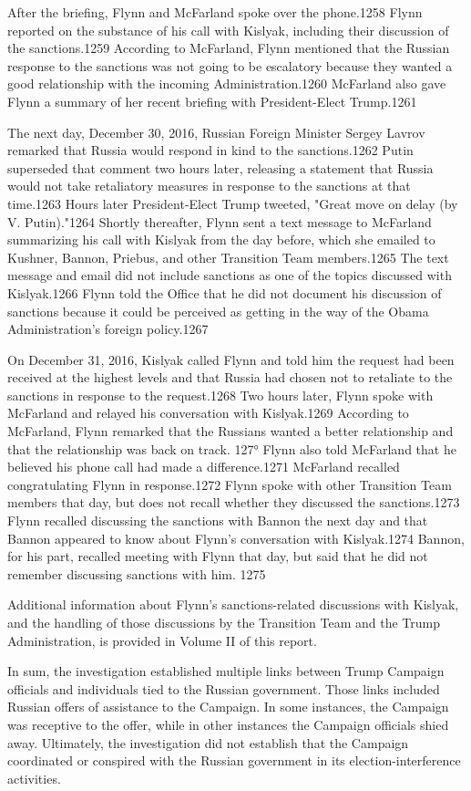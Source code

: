 After the briefing, Flynn and McFarland spoke over the phone.1258 Flynn reported on the substance of his call with Kislyak, including their discussion of the sanctions.1259 According to McFarland, Flynn mentioned that the Russian response to the sanctions was not going to be escalatory because they wanted a good relationship with the incoming Administration.1260 McFarland also gave Flynn a summary of her recent briefing with President-Elect Trump.1261

The next day, December 30, 2016, Russian Foreign Minister Sergey Lavrov remarked that Russia would respond in kind to the sanctions.1262 Putin superseded that comment two hours later, releasing a  statement that Russia would not take retaliatory measures in response to the sanctions at that time.1263 Hours later President-Elect Trump tweeted, "Great move on delay (by V. Putin)."1264 Shortly thereafter, Flynn sent a text message to McFarland summarizing his call with Kislyak from the day before, which she emailed to Kushner, Bannon, Priebus, and other Transition Team members.1265 The text message and email did not include sanctions as one of the topics discussed with Kislyak.1266 Flynn told the Office that he did not document his discussion of sanctions because it could be perceived as getting in the way of the Obama Administration's foreign policy.1267

On December 31, 2016, Kislyak called Flynn and told him the request had been received at the highest levels and that Russia had chosen not to retaliate to the sanctions in response to the request.1268 Two hours later,  Flynn spoke with McFarland and relayed his conversation with Kislyak.1269 According to McFarland, Flynn remarked that the Russians wanted a better relationship and that the relationship was back on track. 127° Flynn also told McFarland that he believed his phone call had made a  difference.1271 McFarland recalled congratulating Flynn in response.1272 Flynn spoke with other Transition Team members that day, but does not recall whether they discussed the sanctions.1273 Flynn recalled discussing the sanctions with Bannon the next day and that Bannon appeared to know about Flynn's conversation with Kislyak.1274 Bannon, for his part, recalled meeting with Flynn that day,  but said that he did not remember discussing sanctions with him. 1275

Additional information about Flynn's sanctions-related discussions with Kislyak, and the handling of those discussions by the Transition Team and the Trump Administration,  is provided in Volume II of this report.

\hr

In sum, the investigation established multiple links between Trump Campaign officials and individuals tied to the Russian government. Those links included Russian offers of assistance to the Campaign. In some instances, the Campaign was receptive to the offer, while in other instances the Campaign officials shied away. Ultimately,  the investigation did not establish that the Campaign coordinated or conspired with the Russian government in its election-interference activities.

